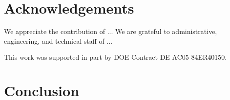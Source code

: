 \section{Acknowledgements}

We appreciate the contribution of ...
We are grateful to administrative, engineering, and technical staff of ...

This work was supported in part by DOE Contract DE-AC05-84ER40150.

\section{Conclusion}



